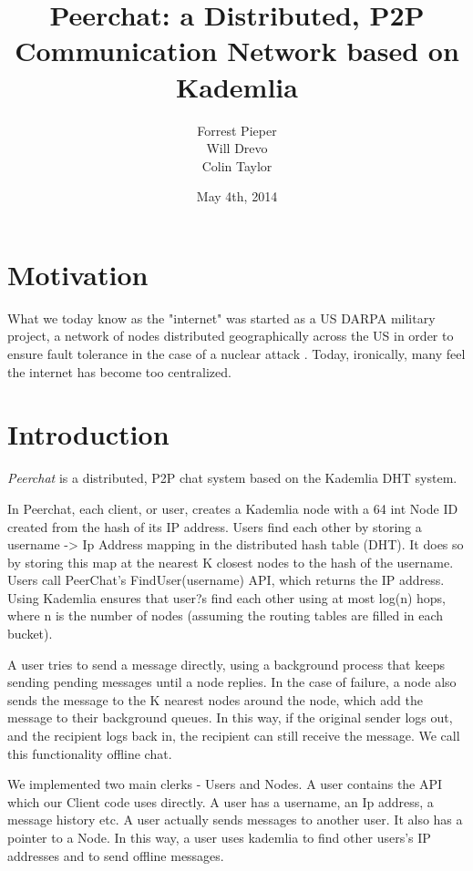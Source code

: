 \documentclass{article}
\title{Peerchat: a Distributed, P2P Communication Network based on Kademlia}
\author{
  Forrest Pieper\\
  Will Drevo\\
  Colin Taylor
}
\date{May 4th, 2014}
\begin{document}
\maketitle

\section{Motivation}
\label{Motivation}

What we today know as the "internet" was started as a US DARPA military project, a network of nodes distributed geographically across the US in order to ensure fault tolerance in the case of a nuclear attack \cite{?}. Today, ironically, many feel the internet has become too centralized. \\

\section{Introduction}

\textit{Peerchat} is a distributed, P2P chat system based on the Kademlia DHT \cite{Maymounkov02} system.

In Peerchat, each client, or user, creates a Kademlia node with a 64 int Node ID created from the hash of its IP address. Users find each other by storing a username -> Ip Address mapping in the distributed hash table (DHT). It does so by storing this map at the nearest K closest nodes to the hash of the username. Users call PeerChat's FindUser(username) API, which returns the IP address. Using Kademlia ensures that user?s find each other using at most log(n) hops, where n is the number of nodes (assuming the routing tables are filled in each bucket). 

A user tries to send a message directly, using a background process that keeps sending pending messages until a node replies. In the case of failure, a node also sends the message to the K nearest nodes around the node, which add the message to their background queues. In this way, if the original sender logs out, and the recipient logs back in, the recipient can still receive the message. We call this functionality offline chat.

We implemented two main clerks - Users and Nodes. A user contains the API which our Client code uses directly. A user has a username, an Ip address, a message history etc. A user actually sends messages to another user. It also has a pointer to a Node. In this way, a user uses kademlia to find other users's IP addresses and to send offline messages.
\end{document}
